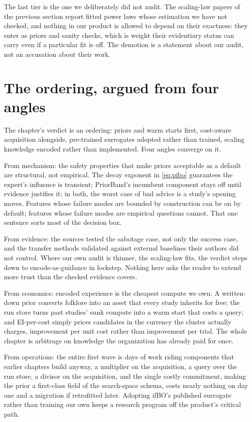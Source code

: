 The last tier is the one we deliberately did not audit. The
scaling-law papers of the previous section report fitted power laws
whose estimation we have not checked, and nothing in our product is
allowed to depend on their exactness: they enter as priors and
sanity checks, which is weight their evidentiary status can carry
even if a particular fit is off. The demotion is a statement about
our audit, not an accusation about their work.

\section{The ordering, argued from four angles}
\label{sec:prior-angles}

The chapter's verdict is an ordering: priors and warm starts first,
cost-aware acquisition alongside, pre-trained surrogates adopted
rather than trained, scaling knowledge encoded rather than
implemented. Four angles converge on it.

From mechanism: the safety properties that make priors acceptable as
a default are structural, not empirical. The decay exponent in
\eqref{eq:pibo} guarantees the expert's influence is transient;
PriorBand's incumbent component stays off until evidence justifies
it; in both, the worst case of bad advice is a study's opening
moves. Features whose failure modes are bounded by construction can
be on by default; features whose failure modes are empirical
questions cannot. That one sentence sorts most of the decision box.

From evidence: the sources tested the sabotage case, not only the
success case, and the transfer methods validated against external
baselines their authors did not control. Where our own audit is
thinner, the scaling-law fits, the verdict steps down to
encode-as-guidance in lockstep. Nothing here asks the reader to
extend more trust than the checked evidence covers.

From economics: encoded experience is the cheapest compute we own.
A written-down prior converts folklore into an asset that every
study inherits for free; the run store turns past studies' sunk
compute into a warm start that costs a query; and EI-per-cost simply
prices candidates in the currency the cluster actually charges,
improvement per unit cost rather than improvement per trial. The
whole chapter is arbitrage on knowledge the organization has already
paid for once.

From operations: the entire first wave is days of work riding
components that earlier chapters build anyway, a multiplier on the
acquisition, a query over the run store, a divisor on the
acquisition, and the single costly commitment, making the prior a
first-class field of the search-space schema, costs nearly nothing
on day one and a migration if retrofitted later. Adopting ifBO's
published surrogate rather than training our own keeps a research
program off the product's critical path.

